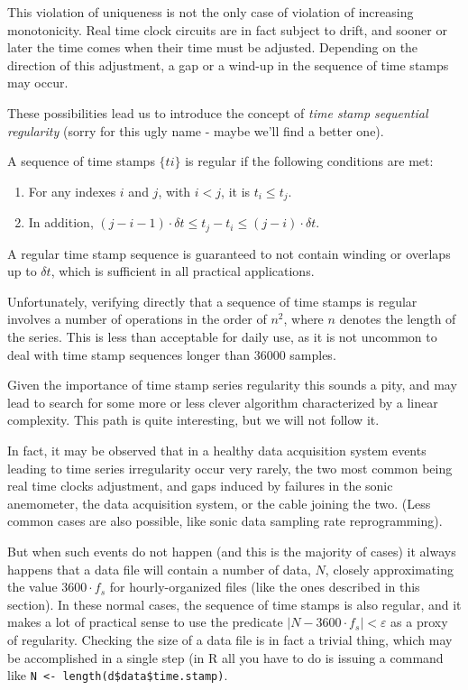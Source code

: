 \documentclass[a4paper,10pt]{book}
\begin{document}
This violation of uniqueness is not the only case of violation of increasing monotonicity. Real time clock circuits are in fact subject to drift, and sooner or later the time comes when their time must be adjusted. Depending on the direction of this adjustment, a gap or a wind-up in the sequence of time stamps may occur.

These possibilities lead us to introduce the concept of \emph{time stamp sequential regularity} (sorry for this ugly name - maybe we'll find a better one).

A sequence of time stamps $\{ t{i} \}$ is regular if the following conditions are met:

\begin{enumerate}
 \item For any indexes $i$ and $j$, with $i < j$, it is $t_{i} \le t_{j}$.
 \item In addition, $(j-i-1) \cdot \delta t \le t_{j} - t_{i} \le (j-i) \cdot \delta t$.
\end{enumerate}

A regular time stamp sequence is guaranteed to not contain winding or overlaps up to $\delta t$, which is sufficient in all practical applications.

Unfortunately, verifying directly that a sequence of time stamps is regular involves a number of operations in the order of $n^{2}$, where $n$ denotes the length of the series. This is less than acceptable for daily use, as it is not uncommon to deal with time stamp sequences longer than 36000 samples.

Given the importance of time stamp series regularity this sounds a pity, and may lead to search for some more or less clever algorithm characterized by a linear complexity. This path is quite interesting, but we will not follow it.

In fact, it may be observed that in a healthy data acquisition system events leading to time series irregularity occur very rarely, the two most common being real time clocks adjustment, and gaps induced by failures in the sonic anemometer, the data acquisition system, or the cable joining the two. (Less common cases are also possible, like sonic data sampling rate reprogramming).

But when such events do not happen (and this is the majority of cases) it always happens that a data file will contain a number of data, $N$, closely approximating the value $3600 \cdot f_{s}$ for hourly-organized files (like the ones described in this section). In these normal cases, the sequence of time stamps is also regular, and it makes a lot of practical sense to use the predicate $\left| N - 3600 \cdot f_{s} \right| < \varepsilon$ as a proxy of regularity. Checking the size of a data file is in fact a trivial thing, which may be accomplished in a single step (in R all you have to do is issuing a command like \verb|N <- length(d$data$time.stamp)|.
\end{document}
